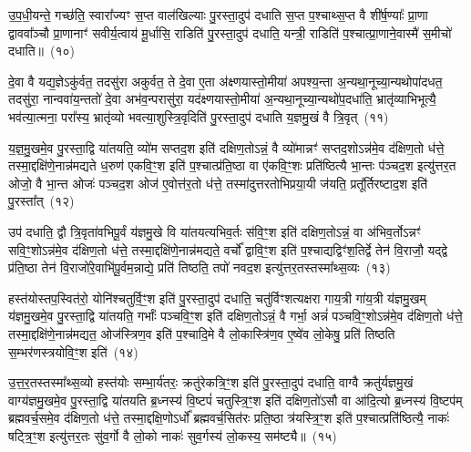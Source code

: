 उ॒प॒धी॒यन्ते॒ गच्छ॑ति॒ स्वारा᳚ज्यꣳ स॒प्त वाल॑खिल्याः पु॒रस्ता॒दुप॑ दधाति स॒प्त प॒श्चाथ्स॒प्त वै शी॑र्\mbox{}ष॒ण्याः᳚ प्रा॒णा द्वाववा᳚ञ्चौ प्रा॒णानाꣳ॑ सवीर्य॒त्वाय॑ मू॒र्धासि॒ राडिति॑ पु॒रस्ता॒दुप॑ दधाति॒ यन्त्री॒ राडिति॑ प॒श्चात्प्रा॒णाने॒वास्मै॑ स॒मीचो॑ दधाति॥~(१०)

{}%

दे॒वा वै यद्य॒ज्ञे\-ऽकु॑र्वत॒ तदसु॑रा अकुर्वत॒ ते दे॒वा ए॒ता अ॑क्ष्णयास्तो॒मीया॑ अपश्य॒न्ता अ॒न्यथा॒नूच्या॒न्यथोपा॑दधत॒ तदसु॑रा॒ नान्ववा॑य॒न्ततो॑ दे॒वा अभ॑व॒न्परासु॑रा॒ यद॑क्ष्णयास्तो॒मीया॑ अ॒न्यथा॒नूच्या॒न्यथो॑प॒दधा॑ति॒ भ्रातृ॑व्याभिभूत्यै॒ भव॑त्या॒त्मना॒ परा᳚स्य॒ भ्रातृ॑व्यो भवत्या॒शुस्त्रि॒वृदिति॑ पु॒रस्ता॒दुप॑ दधाति य॒ज्ञमु॒खं वै त्रि॒वृत्~(११)

य॒ज्ञ॒मु॒खमे॒व पु॒रस्ता॒द्वि या॑तयति॒ व्यो॑म सप्तद॒श इति॑ दक्षिण॒तो\-ऽन्नं॒ वै व्यो॑मान्नꣳ॑ सप्तद॒शो\-ऽन्न॑मे॒व द॑क्षिण॒तो ध॑त्ते॒ तस्मा॒द्दक्षि॑णे॒नान्न॑मद्यते ध॒रुण॑ एकवि॒ꣳ॒श इति॑ प॒श्चात्प्र॑ति॒ष्ठा वा ए॑कवि॒ꣳ॒शः प्रति॑ष्ठित्यै भा॒न्तः प॑ञ्चद॒श इत्यु॑त्तर॒त ओजो॒ वै भा॒न्त ओजः॑ पञ्चद॒श ओज॑ ए॒वोत्त॑र॒तो ध॑त्ते॒ तस्मा॑दुत्तरतोभिप्रया॒यी ज॑यति॒ प्रतू᳚र्तिरष्टाद॒श इति॑ पु॒रस्ता᳚त्~(१२)

उप॑ दधाति॒ द्वौ त्रि॒वृता॑वभिपू॒र्वं य॑ज्ञमु॒खे वि या॑तयत्यभिव॒र्तः स॑वि॒ꣳ॒श इति॑ दक्षिण॒तो\-ऽन्नं॒ वा अ॑भिव॒र्तो\-ऽन्नꣳ॑ सवि॒ꣳ॒शो\-ऽन्न॑मे॒व द॑क्षिण॒तो ध॑त्ते॒ तस्मा॒द्दक्षि॑णे॒नान्न॑मद्यते॒ वर्चो᳚ द्वावि॒ꣳ॒श इति॑ प॒श्चाद्यद्विꣳ॑श॒तिर्द्वे तेन॑ वि॒राजौ॒ यद्द्वे प्र॑ति॒ष्ठा तेन॑ वि॒राजो॑रे॒वाभि॑पू॒र्वम॒न्नाद्ये॒ प्रति॑ तिष्ठति॒ तपो॑ नवद॒श इत्यु॑त्तर॒तस्तस्मा᳚थ्स॒व्यः~(१३)

हस्त॑योस्तप॒स्वित॑रो॒ योनि॑श्चतुर्वि॒ꣳ॒श इति॑ पु॒रस्ता॒दुप॑ दधाति॒ चतु॑र्विꣳशत्यक्षरा गाय॒त्री गा॑य॒त्री य॑ज्ञमु॒खम् य॑ज्ञमु॒खमे॒व पु॒रस्ता॒द्वि या॑तयति॒ गर्भाः᳚ पञ्चवि॒ꣳ॒श इति॑ दक्षिण॒तो\-ऽन्नं॒ वै गर्भा॒ अन्नं॑ पञ्चवि॒ꣳ॒शो\-ऽन्न॑मे॒व द॑क्षिण॒तो ध॑त्ते॒ तस्मा॒द्दक्षि॑णे॒नान्न॑मद्यत॒ ओज॑स्त्रिण॒व इति॑ प॒श्चादि॒मे वै लो॒कास्त्रि॑ण॒व ए॒ष्वे॑व लो॒केषु॒ प्रति॑ तिष्ठति स॒म्भर॑णस्त्रयोवि॒ꣳ॒श इति॑~(१४)

उ॒त्त॒र॒तस्तस्मा᳚थ्स॒व्यो हस्त॑योः सम्भा॒र्य॑तरः॒ क्रतु॑रेकत्रि॒ꣳ॒श इति॑ पु॒रस्ता॒दुप॑ दधाति॒ वाग्वै क्रतु॑र्यज्ञमु॒खं वाग्य॑ज्ञमु॒खमे॒व पु॒रस्ता॒द्वि या॑तयति ब्र॒ध्नस्य॑ वि॒ष्टपं॑ चतुस्त्रि॒ꣳ॒श इति॑ दक्षिण॒तो॑\-ऽसौ वा आ॑दि॒त्यो ब्र॒ध्नस्य॑ वि॒ष्टप॑म् ब्रह्मवर्च॒समे॒व द॑क्षिण॒तो ध॑त्ते॒ तस्मा॒द्दक्षि॒णो\-ऽर्धो᳚ ब्रह्मवर्च॒सित॑रः प्रति॒ष्ठा त्र॑यस्त्रि॒ꣳ॒श इति॑ प॒श्चात्प्रति॑ष्ठित्यै॒ नाकः॑ षट्त्रि॒ꣳ॒श इत्यु॑त्तर॒तः सु॑व॒र्गो वै लो॒को नाकः॑ सुव॒र्गस्य॑ लो॒कस्य॒ सम॑ष्ट्यै॥~(१५)

